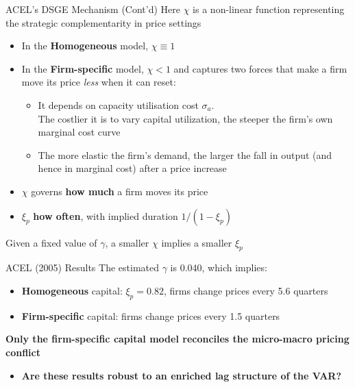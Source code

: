 \documentclass[11pt]{beamer}
\begin{document}
\begin{frame}{ACEL's DSGE Mechanism (Cont'd)}\label{slide:acel_dsge_mechanism}
 Here $\chi$ is a non-linear function representing the strategic complementarity in price settings 
\begin{itemize}
    \item In the \textbf{Homogeneous} model, $\chi \equiv 1$
    \item In the \textbf{Firm-specific} model, $\chi < 1$ and captures two forces that make a firm move its price \textit{less} when it can reset:
    \begin{itemize}
        \item It depends on capacity utilisation cost $\sigma_a$.
        \\
              The costlier it is to vary capital utilization, the steeper the firm's own marginal cost curve
        \item The more elastic the firm's demand, the larger the fall in output (and hence in marginal cost) after a price increase
    \end{itemize}
    \vspace{0.3cm}
    
    \item $\chi$ governs \textbf{how much} a firm moves its price
    \item $\xi_p$ \textbf{how often}, with implied duration $1/(1-\xi_p)$
\end{itemize}
 Given a fixed value of $\gamma$, a smaller $\chi$ implies a smaller $\xi_p$

 \begin{center}
        \hyperlink{slide:acel_mp_shock_prop_mech}{}
    \end{center}

\end{frame}



\begin{frame}{ACEL (2005) Results}
    The estimated $\gamma$ is 0.040, which implies:
    \begin{itemize}
        \item \textbf{Homogeneous} capital: $\xi_p = 0.82$, firms change prices every 5.6 quarters
        \item \textbf{Firm-specific} capital: firms change prices every 1.5 quarters
    \end{itemize}
\vspace{0.1cm}
\textbf{Only the firm-specific capital model reconciles the micro-macro pricing conflict}
\vspace{0.5cm}
\pause

\begin{itemize}
    \item \textbf{\textcolor{PadovaRed}{Are these results robust to an enriched lag structure of the VAR?}}
\end{itemize}
\end{frame}
\end{document}
